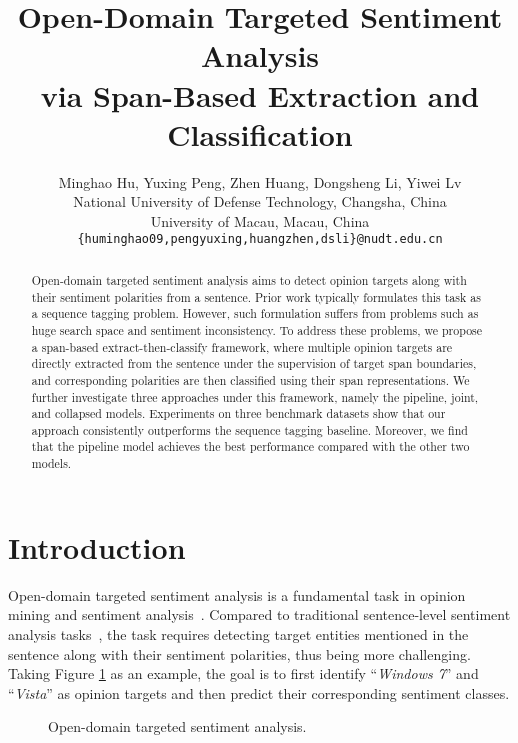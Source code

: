 \documentclass[11pt,a4paper]{article}
\title{Open-Domain Targeted Sentiment Analysis \\ via Span-Based Extraction and Classification}
\author{
Minghao Hu,
Yuxing Peng,
Zhen Huang,
Dongsheng Li,
Yiwei Lv \\
 National University of Defense Technology, Changsha, China \\
 University of Macau, Macau, China  \\
{\tt \{huminghao09,pengyuxing,huangzhen,dsli\}@nudt.edu.cn} \\
}
\date{}
\begin{document}
\maketitle

\begin{abstract}

Open-domain targeted sentiment analysis aims to detect opinion targets along with their sentiment polarities from a sentence.
Prior work typically formulates this task as a sequence tagging problem.
However, such formulation suffers from problems such as huge search space and sentiment inconsistency.
To address these problems, we propose a span-based extract-then-classify framework, where multiple opinion targets are directly extracted from the sentence under the supervision of target span boundaries, and corresponding polarities are then classified using their span representations.
We further investigate three approaches under this framework, namely the pipeline, joint, and collapsed models.
Experiments on three benchmark datasets show that our approach consistently outperforms the sequence tagging baseline.
Moreover, we find that the pipeline model achieves the best performance compared with the other two models.

\end{abstract} \section{Introduction	\label{intro}}
Open-domain targeted sentiment analysis is a fundamental task in opinion mining and sentiment analysis~\cite{pang2008opinion,liu2012sentiment}.
Compared to traditional sentence-level sentiment analysis tasks~\cite{lin2009joint,kim2014convolutional}, the task requires detecting target entities mentioned in the sentence along with their sentiment polarities, thus being more challenging.
Taking Figure \ref{fig:example} as an example, the goal is to first identify ``\emph{Windows 7}'' and ``\emph{Vista}'' as opinion targets and then predict their corresponding sentiment classes.

\begin{figure}[h]
\center
{}
\caption{Open-domain targeted sentiment analysis.}
\label{fig:example}
\end{figure}
\end{document}
